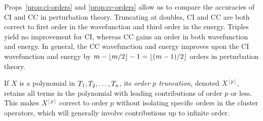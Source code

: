 \documentclass[11pt]{article}
\numberwithin{equation}{section}
\newcommand{\bord}[1]{\ensuremath{^{[#1]}}}
\begin{document}
\begin{ex}
Props~\ref{prop:ci-orders} and \ref{prop:cc-orders} allow us to compare the accuracies of CI and CC in perturbation theory.
Truncating at doubles, CI and CC are both correct to first order in the wavefunction and third order in the energy.
Triples yield no improvement for CI, whereas CC gains an order in both wavefunction and energy.
In general, the CC wavefunction and energy improves upon the CI wavefunction and energy by
$
  m
-
  \left\lfloor m/2\right\rfloor
-
  1
=
  \left\lfloor(m-1)/2\right\rfloor
$
orders in perturbation theory.
\end{ex}

\begin{dfn}
If $X$ is a polynomial in $T_1,T_2,\ldots,T_n$,
its \textit{order $p$ truncation}, denoted $X\bord{p}$, retains all terms in the polynomial with leading contributions of order $p$ or less.
This makes $X\bord{p}$ correct to order $p$ without isolating specific orders in the cluster operators, which will generally involve contributions up to infinite order.
\end{dfn}
\end{document}
